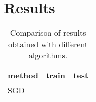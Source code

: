 \section{Results}

\begin{table}
  \centering
\begin{tabular}{|l|c|c|}
  method & train & test \\
  \hline
  SGD & & \\
  \hline 
\end{tabular}
  \caption{Comparison of results obtained with different algorithms.}
  \label{tab:results}
\end{table}



